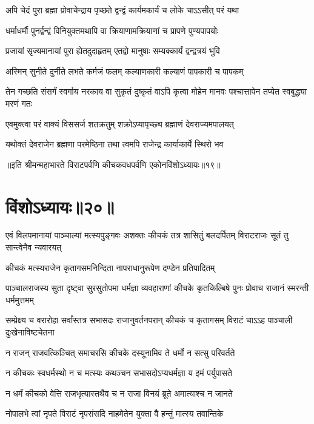 \twolineshloka
{अपि चेदं पुरा ब्रह्मा प्रोवाचेन्द्राय पृच्छते}
{द्वन्द्वं कार्यमकार्यं च लोके चाऽऽसीत् परं यथा}


\twolineshloka
{धर्माधर्मौ पुनर्द्वन्द्वं विनियुक्तमथापि वा}
{क्रियाणामक्रियाणां च प्रापणे पुण्यपापयोः}


\twolineshloka
{प्रजायां सृज्यमानायां पुरा ह्येतदुदाहृतम्}
{एतद्वो मानुषाः सम्यक्कार्यं द्वन्द्वत्रयं भुवि}


\twolineshloka
{अस्मिन् सुनीते दुर्नीते लभते कर्मजं फलम्}
{कल्याणकारी कल्याणं पापकारी च पापकम्}


\threelineshloka
{तेन गच्छति संसर्गं स्वर्गाय नरकाय वा}
{सुकृतं दुष्कृतं वाऽपि कृत्वा मोहेन मानवः}
{पश्चात्तापेन तप्येत स्वबुद्ध्या मरणं गतः}


\twolineshloka
{एवमुक्त्वा परं वाक्यं विससर्ज शतक्रतुम्}
{शक्रोऽप्यापृच्छ्य ब्रह्माणं देवराज्यमपालयत्}


\twolineshloka
{यथोक्तं देवराजेन ब्रह्मणा परमेष्ठिना}
{तथा त्वमपि राजेन्द्र कार्याकार्ये स्थिरो भव}

॥इति श्रीमन्महाभारते विराटपर्वणि कीचकवधपर्वणि एकोनविंशोऽध्यायः॥१९॥

\chapter{विंशोऽध्यायः॥२०॥}

\threelineshloka
{एवं विलपमानायां पाञ्चाल्यां मत्स्यपुङ्गवः}
{अशक्तः कीचकं तत्र शासितुं बलदर्पितम्}
{विराटराजः सूतं तु सान्त्वेनैव न्यवारयत्}


\twolineshloka
{कीचकं मत्स्यराजेन कृतागसमनिन्दिता}
{नापराधानुरूपेण दण्डेन प्रतिपादितम्}


\threelineshloka
{पाञ्चालराजस्य सुता दृष्ट्वा सुरसुतोपमा}
{धर्मज्ञा व्यवहाराणां कीचके कृतकिल्बिषे}
{पुनः प्रोवाच राजानं स्मरन्ती धर्ममुत्तमम्}


\threelineshloka
{सम्प्रेक्ष्य च वरारोहा सर्वांस्तत्र सभासदः}
{राजानुवर्तनपरान् कीचकं च कृतागसम्}
{विराटं चाऽऽह पाञ्चाली दुःखेनाविष्टचेतना}


\twolineshloka
{न राजन् राजवत्किञ्चित् समाचरसि कीचके}
{दस्यूनामिव ते धर्मो न सत्सु परिवर्तते}


\twolineshloka
{न कीचकः स्वधर्मस्थो न च मत्स्यः कथञ्चन}
{सभासदोऽप्यधर्मज्ञा य इमं पर्युपासते}


\twolineshloka
{न धर्मं कीचको वेत्ति राजभृत्यास्तथैव च}
{न राजा विनयं ब्रूते अमात्याश्च न जानते}


\twolineshloka
{नोपालभे त्वां नृपते विराटं नृपसंसदि}
{नाहमेतेन युक्ता वै हन्तुं मात्स्य तवान्तिके}



